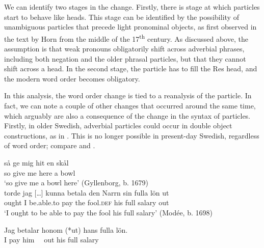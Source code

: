\documentclass[output=paper]{langscibook}
\begin{document}
We can identify two stages in the change. Firstly, there is stage at which particles start to behave like heads. This stage can be identified by the possibility of unambiguous particles that precede light pronominal objects, as first observed in the text by Horn from the middle of the 17\textsuperscript{th} century. As discussed above, the assumption is that weak pronouns obligatorily shift across adverbial phrases, including both negation and the older phrasal particles, but that they cannot shift across a head. In the second stage, the particle has to fill the Res head, and the modern word order becomes obligatory. 



In this analysis, the word order change is tied to a reanalysis of the particle. In fact, we can note a couple of other changes that occurred around the same time, which arguably are also a consequence of the change in the syntax of particles. Firstly, in older Swedish, adverbial particles could occur in double object constructions, as in . This is no longer possible in present-day Swedish, regardless of word order; compare  and .


\ea\label{ex:lalu:58}
\ea
\gll  så   ge     mig     hit  en   skål  \\
 so   give     me     here   a     bowl \\
\glt `so give me a bowl here’ (Gyllenborg, b. 1679)\\

\ex
\gll  torde  jag […]  kunna     betala   den   Narrn     sin   fulla   lön   ut \\
      ought  I   {}    be.able.to  pay     the   fool\textsc{.def}   his   full   salary   out\\
\glt `I ought to be able to pay the fool his full salary’ (Modée, b. 1698)\\
\z
\ex\label{ex:lalu:59}

\ex
\gll  Jag   betalar   honom   (*ut)   hans   fulla   lön.  \\
    I       pay     him       ~~out   his   full   salary\\
\z
\ex\label{ex:lalu:60}
\z
\z
\end{document}
